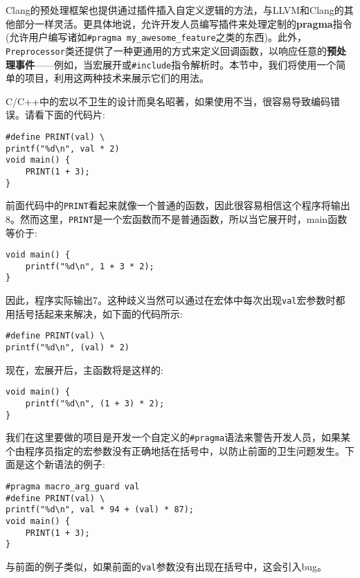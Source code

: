 
Clang的预处理框架也提供通过插件插入自定义逻辑的方法，与LLVM和Clang的其他部分一样灵活。更具体地说，允许开发人员编写插件来处理定制的\textbf{pragma}指令(允许用户编写诸如\texttt{\#pragma my\_awesome\_feature}之类的东西)。此外，\texttt{Preprocessor}类还提供了一种更通用的方式来定义回调函数，以响应任意的\textbf{预处理事件}——例如，当宏展开或\texttt{\#include}指令解析时。本节中，我们将使用一个简单的项目，利用这两种技术来展示它们的用法。


C/C++中的宏以不卫生的设计而臭名昭著，如果使用不当，很容易导致编码错误。请看下面的代码片:

\begin{lstlisting}[style=styleCXX]
#define PRINT(val) \
printf("%d\n", val * 2)
void main() {
	PRINT(1 + 3);
}
\end{lstlisting}

前面代码中的\texttt{PRINT}看起来就像一个普通的函数，因此很容易相信这个程序将输出8。然而这里，\texttt{PRINT}是一个宏函数而不是普通函数，所以当它展开时，main函数等价于:

\begin{lstlisting}[style=styleCXX]
void main() {
	printf("%d\n", 1 + 3 * 2);
}
\end{lstlisting}

因此，程序实际输出7。这种歧义当然可以通过在宏体中每次出现\texttt{val}宏参数时都用括号括起来来解决，如下面的代码所示:

\begin{lstlisting}[style=styleCXX]
#define PRINT(val) \
printf("%d\n", (val) * 2)
\end{lstlisting}

现在，宏展开后，主函数将是这样的:

\begin{lstlisting}[style=styleCXX]
void main() {
	printf("%d\n", (1 + 3) * 2);
}
\end{lstlisting}

我们在这里要做的项目是开发一个自定义的\texttt{\#pragma}语法来警告开发人员，如果某个由程序员指定的宏参数没有正确地括在括号中，以防止前面的卫生问题发生。下面是这个新语法的例子:

\begin{lstlisting}[style=styleCXX]
#pragma macro_arg_guard val
#define PRINT(val) \
printf("%d\n", val * 94 + (val) * 87);
void main() {
	PRINT(1 + 3);
}
\end{lstlisting}

与前面的例子类似，如果前面的\texttt{val}参数没有出现在括号中，这会引入bug。


